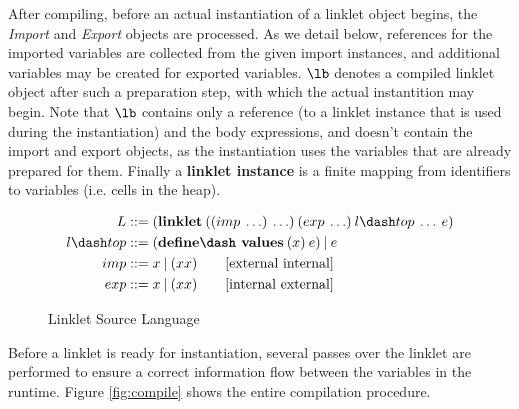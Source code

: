 After compiling, before an actual instantiation of a linklet object
begins, the \textit{Import} and \textit{Export} objects are
processed. As we detail below, references for the imported variables
are collected from the given import instances, and additional
variables may be created for exported variables. $\lb$ denotes a
compiled linklet object after such a preparation step, with which the
actual instantition may begin. Note that $\lb$ contains only a
reference (to a linklet instance that is used during the
instantiation) and the body expressions, and doesn't contain the
import and export objects, as the instantiation uses the variables
that are already prepared for them. Finally a \textbf{linklet\dash
  instance} is a finite mapping from identifiers to variables
(i.e. cells in the heap).

\begin{figure}[tbp]
  \begin{mdframed}
    \begin{align*}
      L  &::= (\textbf{linklet}\:((imp\: \ldots)\: \ldots)\:(exp\: \ldots)\:l\dash top\:\ldots\:e)\\
      l\dash top &::= (\textbf{define\dash values}\:(x)\:e)\:|\:e \\
      imp &::= x\:|\:(x x) \tag*{[external internal]}\\
      exp &::= x\:|\:(x x) \tag*{[internal external]}
    \end{align*}
  \caption{Linklet Source Language}
  \label{fig:linklet-source}
  \end{mdframed}
\end{figure}

Before a linklet is ready for instantiation, several passes over the
linklet are performed to ensure a correct information flow between the
variables in the run\dash time. Figure \ref{fig:compile} shows the
entire compilation procedure.

